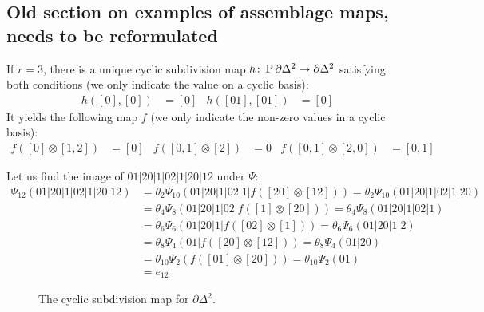 \subsection{Old section on examples of assemblage maps, needs to be reformulated}
If $r=3$, there is a unique cyclic subdivision map $h\colon \operatorname{P} \partial \Delta^{2}\to \partial \Delta^2$ satisfying both conditions (we only indicate the value on a cyclic basis):
\begin{align*}
    h([0],[0]) &= [0] &
    h([01],[01]) &= [0] 
\end{align*}
It yields the following map $f$ (we only indicate the non-zero values in a cyclic basis):
\begin{align*}
f([0]\otimes [1,2]) &= [0] & 
f([0,1]\otimes [2])&=0 &
f([0,1]\otimes [2,0]) &= [0,1]
\end{align*}
\begin{example}\label{ex:107}
    Let us find the image of $01|20|1|02|1|20|12$ under $\Psi$:
    \begin{align*}
        \Psi_{12}(01|20|1|02|1|20|12) &= \theta_2\Psi_{10}(01|20|1|02|1|f([20]\otimes[12])) = \theta_2\Psi_{10}(01|20|1|02|1|20)
        \\ &= \theta_4\Psi_8(01|20|1|02|f([1]\otimes [20])) = \theta_4\Psi_8(01|20|1|02|1)
        \\ &= \theta_6\Psi_6(01|20|1|f([02]\otimes [1])) = \theta_6\Psi_6(01|20|1|2)
        \\ &= \theta_8\Psi_4(01|f([20]\otimes [12])) = \theta_8\Psi_4(01|20)
        \\ &= \theta_{10}\Psi_2(f([01]\otimes [20])) = \theta_{10}\Psi_2(01) 
        \\ &= e_{12}
    \end{align*}
\end{example}
\begin{figure}
\caption{The cyclic subdivision map for $\partial \Delta^2$.}
\end{figure}

